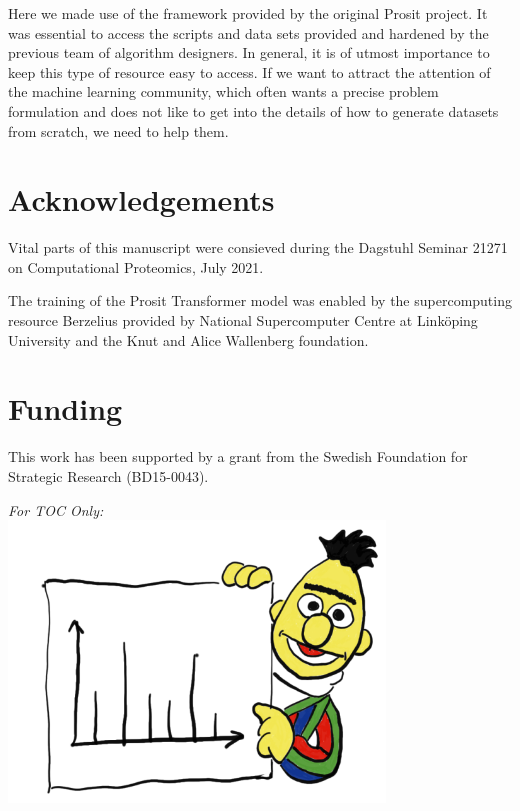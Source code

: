 \documentclass[10pt,a4paper]{article}
\begin{document}
Here we made use of the framework provided by the original Prosit project. It was essential to access the scripts and data sets provided and hardened by the previous team of algorithm designers. In general, it is of utmost importance to keep this type of resource easy to access. If we want to attract the attention of the machine learning community, which often wants a precise problem formulation and does not like to get into the details of how to generate datasets from scratch, we need to help them.


\section*{Acknowledgements}
Vital parts of this manuscript were consieved during the Dagstuhl Seminar 21271 on Computational Proteomics, July 2021.

The training of the Prosit Transformer model was enabled by the supercomputing resource Berzelius provided by National Supercomputer Centre at Linköping University and the Knut and Alice Wallenberg foundation.

\section*{Funding}

This work has been supported by a grant from the Swedish Foundation for Strategic Research (BD15-0043).





\newpage
{\em For TOC Only:}\\[2em]
\centering
    \includegraphics[width=10cm]{./img/bert.png}
\end{document}

